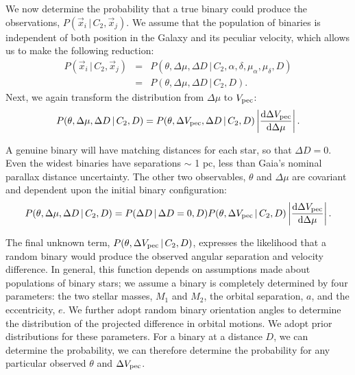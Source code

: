 \documentclass[usenatbib]{mnras}
\newcommand{\given}{\,|\,}
\newcommand{\dd}{\mathrm{d}}
\begin{document}
We now determine the probability that a true binary could produce the observations, $P(\vec{x}_i \given C_2, \vec{x}_j)$. We assume that the population of binaries is independent of both position in the Galaxy and its peculiar velocity, which allows us to make the following reduction:
\begin{eqnarray}
P(\vec{x}_i \given C_2, \vec{x}_j) &=& P(\theta, \Delta \mu, \Delta D \given C_2, \alpha, \delta, \mu_{\alpha}, \mu_{\delta}, D ) \\
&=& P(\theta, \Delta \mu, \Delta D \given C_2, D).
\end{eqnarray}
Next, we again transform the distribution from $\Delta \mu$ to $V_{\rm pec}$:
\begin{equation}
P(\theta, \Delta \mu, \Delta D \given C_2, D) = P(\theta, \Delta V_{\rm pec}, \Delta D \given C_2, D) \left| \frac{\dd \Delta V_{\rm pec}}{\dd \Delta \mu} \right|.
\end{equation}

A genuine binary will have matching distances for each star, so that $\Delta D = 0$. Even the widest binaries have separations $\sim$ 1 pc, less than Gaia's nominal parallax distance uncertainty. The other two observables, $\theta$ and $\Delta \mu$ are covariant and dependent upon the initial binary configuration:
\begin{equation}
P(\theta, \Delta \mu, \Delta D \given C_2, D) = P(\Delta D \given \Delta D=0, D) P(\theta, \Delta V_{\rm pec} \given C_2, D) \left| \frac{\dd \Delta V_{\rm pec}}{\dd \Delta \mu} \right|.
\end{equation}

The final unknown term, $P(\theta, \Delta V_{\rm pec} \given C_2, D)$, expresses the likelihood that a random binary would produce the observed angular separation and velocity difference. In general, this function depends on assumptions made about populations of binary stars; we assume a binary is completely determined by four parameters: the two stellar masses, $M_1$ and $M_2$, the orbital separation, $a$, and the eccentricity, $e$. We further adopt random binary orientation angles to determine the distribution of the projected difference in orbital motions. We adopt prior distributions for these parameters. For a binary at a distance $D$, we can determine the probability, we can therefore determine the probability for any particular observed $\theta$ and $\Delta V_{\rm pec}$.



\end{document}
